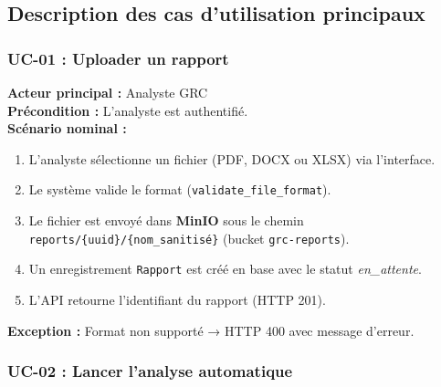 \documentclass[a4paper,12pt,oneside]{report}
\begin{document}
	\subsection{Description des cas d'utilisation principaux}
	
	\subsubsection*{UC-01 : Uploader un rapport}
	
	\begin{tcolorbox}[colback=lightgray!20, colframe=darknavy, title=UC-01 — Uploader un rapport]
		\textbf{Acteur principal :} Analyste GRC \\
		\textbf{Précondition :} L'analyste est authentifié. \\
		\textbf{Scénario nominal :}
		\begin{enumerate}
			\item L'analyste sélectionne un fichier (PDF, DOCX ou XLSX) via l'interface.
			\item Le système valide le format (\texttt{validate\_file\_format}).
			\item Le fichier est envoy\'e dans \textbf{MinIO} sous le chemin
			\texttt{reports/\{uuid\}/\{nom\_sanitisé\}} (bucket \texttt{grc-reports}).
			\item Un enregistrement \texttt{Rapport} est créé en base avec le statut
			\textit{en\_attente}.
			\item L'API retourne l'identifiant du rapport (HTTP 201).
		\end{enumerate}
		\textbf{Exception :} Format non supporté → HTTP 400 avec message d'erreur.
	\end{tcolorbox}
	
	\subsubsection*{UC-02 : Lancer l'analyse automatique}
	
\end{document}
